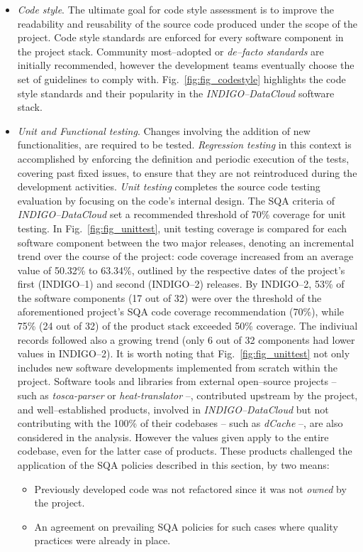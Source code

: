 \documentclass[journal]{IEEEtran}
\begin{document}
\begin{itemize}
\item \textit{Code style}.
The ultimate goal for code style assessment is to improve the readability and reusability of the
source code produced under the scope of the
project. Code style standards are enforced for every software component in the project stack. Community
most--adopted or \textit{de--facto standards} are initially recommended, however the development teams eventually
choose the set of guidelines to comply with. Fig.~\ref{fig:fig_codestyle} highlights the code style standards and
their popularity
in the {\sl INDIGO--DataCloud} software stack.

\item \textit{Unit and Functional testing}.
Changes involving the addition of new functionalities, are required to be tested. \textit{Regression
testing} in this context is accomplished by enforcing the definition and periodic execution
of the tests, covering past fixed issues, to ensure that they are not reintroduced during the development
activities. \textit{Unit testing} completes the source code testing evaluation by focusing on the code's
internal design. The SQA criteria of {\sl INDIGO--DataCloud} set a recommended threshold of 70\% coverage
for unit testing. In Fig.~\ref{fig:fig_unittest}, unit testing coverage is compared for each software
component between the two major releases, denoting an incremental trend over the course of the project:
code coverage increased from an average value of 50.32\% to 63.34\%, outlined by the respective dates of
the project's first (INDIGO--1) and second (INDIGO--2) releases. By INDIGO--2, 53\% of the software components
(17 out of 32) were over the threshold of the aforementioned project's SQA code coverage recommendation
(70\%), while 75\% (24 out of 32) of the product stack exceeded 50\% coverage. 
The indiviual records followed also a growing trend (only 6 out of 32 components had lower values in 
INDIGO--2). It is worth noting that Fig.~\ref{fig:fig_unittest} not only includes new software developments 
implemented from scratch within the project. Software tools and libraries from 
external open--source projects -- such as {\sl tosca-parser} or {\sl heat-translator} --, contributed upstream
by the project, and well--established products, involved in {\sl INDIGO--DataCloud}
but not contributing with the 100\% of their codebases -- such as {\sl dCache} --, are also considered in the
analysis. However the values given apply to the entire codebase, even for the latter case of products. These 
products challenged the application of the SQA policies described in this section, by two means:
\begin{itemize}
    \item Previously developed code was not refactored since it was not \textit{owned} by the project.
    \item An agreement on prevailing SQA policies for such cases where quality practices were already in place.
\end{itemize}


\end{itemize}
\end{document}
